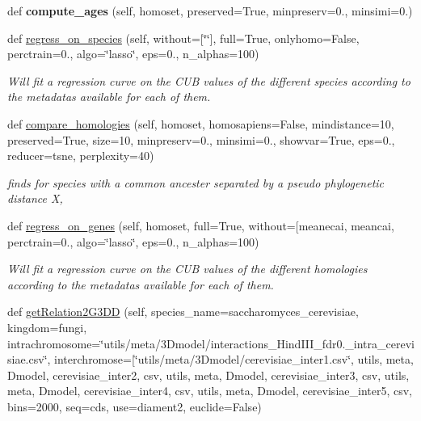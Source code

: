 \begin{DoxyCompactItemize}
\mbox{\label{class_py_c_u_b_1_1py_c_u_b_1_1_py_c_u_b_af1cab3e8d69796c1a9a54a57a76228cd}} 
def {\bfseries compute\+\_\+ages} (self, homoset, preserved=True, minpreserv=0., minsimi=0.)
\item 
def \mbox{\hyperlink{class_py_c_u_b_1_1py_c_u_b_1_1_py_c_u_b_af37319783148fc8864d894b3e2f89078}{regress\+\_\+on\+\_\+species}} (self, without=\mbox{[}\char`\"{}\char`\"{}\mbox{]}, full=True, onlyhomo=False, perctrain=0., algo=\char`\"{}lasso\char`\"{}, eps=0., n\+\_\+alphas=100)
\begin{DoxyCompactList}\small\item\em Will fit a regression curve on the C\+UB values of the different species according to the metadatas available for each of them. \end{DoxyCompactList}\item 
def \mbox{\hyperlink{class_py_c_u_b_1_1py_c_u_b_1_1_py_c_u_b_ad350376cd68d4daacec78c694ed754c6}{compare\+\_\+homologies}} (self, homoset, homosapiens=False, mindistance=10, preserved=True, size=10, minpreserv=0., minsimi=0., showvar=True, eps=0., reducer=\textquotesingle{}tsne\textquotesingle{}, perplexity=40)
\begin{DoxyCompactList}\small\item\em finds for species with a common ancester separated by a pseudo phylogenetic distance X, \end{DoxyCompactList}\item 
def \mbox{\hyperlink{class_py_c_u_b_1_1py_c_u_b_1_1_py_c_u_b_a1b65efe7deb4ba5f65203c8be6fc7af2}{regress\+\_\+on\+\_\+genes}} (self, homoset, full=True, without=\mbox{[}\textquotesingle{}meanecai\textquotesingle{}, meancai, perctrain=0., algo=\char`\"{}lasso\char`\"{}, eps=0., n\+\_\+alphas=100)
\begin{DoxyCompactList}\small\item\em Will fit a regression curve on the C\+UB values of the different homologies according to the metadatas available for each of them. \end{DoxyCompactList}\item 
def \mbox{\hyperlink{class_py_c_u_b_1_1py_c_u_b_1_1_py_c_u_b_a2745e82c660b71220578130e74e32add}{get\+Relation2\+G3\+DD}} (self, species\+\_\+name=\textquotesingle{}saccharomyces\+\_\+cerevisiae\textquotesingle{}, kingdom=\textquotesingle{}fungi\textquotesingle{}, intrachromosome=\char`\"{}utils/meta/3\+Dmodel/interactions\+\_\+\+Hind\+I\+I\+I\+\_\+fdr0.\+\_\+intra\+\_\+cerevisiae.\+csv\char`\"{}, interchromose=\mbox{[}\char`\"{}utils/meta/3\+Dmodel/cerevisiae\+\_\+inter1.\+csv\char`\"{}, utils, meta, Dmodel, cerevisiae\+\_\+inter2, csv, utils, meta, Dmodel, cerevisiae\+\_\+inter3, csv, utils, meta, Dmodel, cerevisiae\+\_\+inter4, csv, utils, meta, Dmodel, cerevisiae\+\_\+inter5, csv, bins=2000, seq=\textquotesingle{}cds\textquotesingle{}, use=\textquotesingle{}diament2\textquotesingle{}, euclide=\+False)

\end{DoxyCompactItemize}
